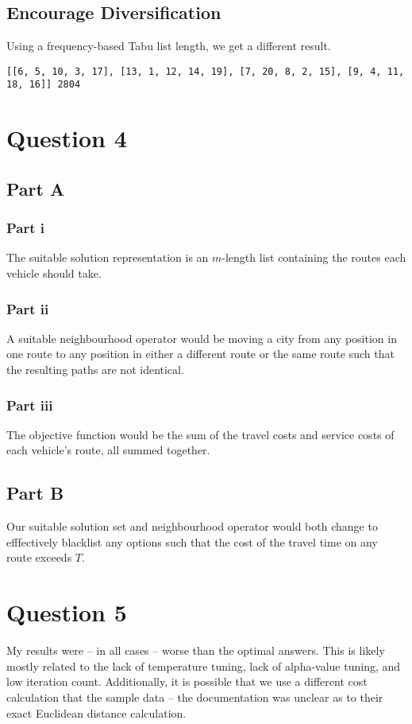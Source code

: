\documentclass[12pt]{article}
\begin{document}
\subsection*{Encourage Diversification}
Using a frequency-based Tabu list length, we get a different result.
\begin{lstlisting}[breaklines=true]
[[6, 5, 10, 3, 17], [13, 1, 12, 14, 19], [7, 20, 8, 2, 15], [9, 4, 11, 18, 16]] 2804
\end{lstlisting}

\section*{Question 4}
\subsection*{Part A}
\subsubsection*{Part i}
The suitable solution representation is an $m$-length list containing the routes each vehicle should take.

\subsubsection*{Part ii}
A suitable neighbourhood operator would be moving a city from any position in one route to any position in either a different route or the same route such that the resulting paths are not identical.

\subsubsection*{Part iii}
The objective function would be the sum of the travel costs and service costs of each vehicle's route, all summed together.

\subsection*{Part B}
Our suitable solution set and neighbourhood operator would both change to efffectively blacklist any options such that the cost of the travel time on any route exceeds $T$.

\section*{Question 5}
My results were -- in all cases -- worse than the optimal answers. This is likely mostly related to the lack of temperature tuning, lack of alpha-value tuning, and low iteration count. Additionally, it is possible that we use a different cost calculation that the sample data -- the documentation was unclear as to their exact Euclidean distance calculation.
\end{document}
